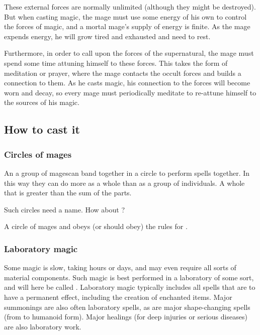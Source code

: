 These external forces are normally unlimited (although they might be destroyed). 
But when casting magic, the mage must use some energy of his own to control the forces of magic, and a mortal mage's supply of energy is finite. 
As the mage expends energy, he will grow tired and exhausted and need to rest. 

Furthermore, in order to call upon the forces of the supernatural, the mage must spend some time attuning himself to these forces. 
This takes the form of meditation or prayer, where the mage contacts the occult forces and builds a connection to them. 
As he casts magic, his connection to the forces will become worn and decay, so every mage must periodically meditate to re-attune himself to the sources of his magic. 









\subsection{How to cast it}





\subsubsection{Circles of mages}
An \dash a group of mages\dash can band together in a circle to perform spells together. In this way they can do more as a whole than as a group of individuals. A whole that is greater than the sum of the parts. 

Such circles need a name. How about ?

A circle of mages  and obeys (or should obey) the rules for \matrices. 





\subsubsection{Laboratory magic}
Some magic is slow, taking hours or days, and may even require all sorts of material components. Such magic is best performed in a laboratory of some sort, and will here be called . Laboratory magic typically includes all spells that are to have a permanent effect, including the creation of enchanted items. Major summonings are also often laboratory spells, as are major shape-changing spells (from \dragon{} to humanoid form). Major healings (for deep injuries or serious diseases) are also laboratory work. 


